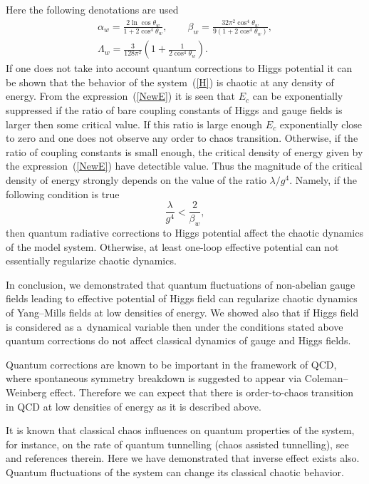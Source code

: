 \documentclass[a4paper,12pt]{article}
\begin{document}
Here the following denotations are used
\begin{gather*}
\alpha_w = \frac{2 \ln{\cos{\theta_w}}}{1 + 2 \cos^{4}{\theta_w}}, \qquad
\beta_w = \frac{32 \pi^2 \cos^{4}{\theta_w}}{9\left(1 + 2 \cos^{4}{\theta_w}\right)}, \\
\Lambda_w = \frac{3}{128 \pi^2}\left( 1+ \frac{1}{2\cos^{4}{\theta_w}} \right).
\end{gather*}
If one does not take into account quantum corrections to Higgs potential it can be
shown that the behavior of the system~(\ref{H}) is chaotic at any density of energy.
From the expression~(\ref{NewE}) it is seen that $E_c$ can be exponentially suppressed
if the ratio of bare coupling constants of Higgs and gauge fields is larger then some
critical value. If this ratio is large enough $E_c$ exponentially close to zero and
one does not observe any order to chaos transition. Otherwise, if the ratio of
coupling constants is small enough, the critical density of energy given by the
expression~(\ref{NewE}) have detectible value. Thus the magnitude of the critical
density of energy strongly depends on the value of the ratio $\lambda / g^4$. Namely,
if the following condition is true
\begin{equation*}
\frac{\lambda}{g^4} < \frac{2}{\beta_w},
\end{equation*}
then quantum radiative corrections to Higgs potential affect the chaotic dynamics of
the model system. Otherwise, at least one-loop effective potential can not essentially
regularize chaotic dynamics.

In conclusion, we demonstrated that quantum fluctuations of non-abelian gauge fields
leading to effective potential of Higgs field can regularize chaotic dynamics of
Yang--Mills fields at low densities of energy. We showed also that if Higgs field is
considered as a~dynamical variable then under the conditions stated above quantum
corrections do not affect classical dynamics of gauge and Higgs fields.

Quantum corrections are known to be important in the framework of QCD, where
spontaneous symmetry breakdown is suggested to appear via Coleman--Weinberg effect.
Therefore we can expect that there is order-to-chaos transition in QCD at low
densities of energy as it is described above.

It is known that classical chaos influences on quantum properties of the system, for
instance, on the rate of quantum tunnelling (chaos assisted tunnelling), see~\cite{B}
and references therein. Here we have demonstrated that inverse effect exists also.
Quantum fluctuations of the system can change its classical chaotic behavior.
\end{document}
